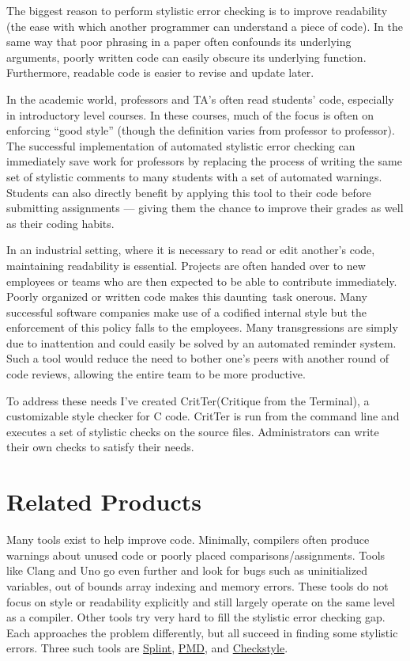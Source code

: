\documentclass[12pt]{report}
\newcommand{\programName}{CritTer\xspace}
\begin{document}
The biggest reason to perform stylistic error checking is to improve readability (the 
ease with which another programmer can understand a piece of code). In the same way that 
poor phrasing in a paper often confounds its underlying arguments, poorly written code can easily 
obscure its underlying function. Furthermore, readable code is easier to revise and update later. 

In the academic world, professors and TA's often read students' code, especially in introductory level
courses. In these courses, much of the focus is often on enforcing ``good style'' (though the definition 
varies from professor to professor).  The successful implementation of automated stylistic error 
checking can immediately save work for professors by replacing the process of writing the same set of 
stylistic comments to many students with a set of automated warnings. Students can also directly 
benefit by applying this tool to their code before submitting assignments --- giving them the chance to 
improve their grades as well as their coding habits.

In an industrial setting, where it is necessary to read or edit another's code, maintaining readability is 
essential. Projects are often handed over to new employees or teams who are then expected to be 
able to contribute immediately. Poorly organized or written code makes this daunting\ task 
onerous. Many successful software companies make use of a codified internal style but the 
enforcement of this policy falls to the employees. Many transgressions are simply due to inattention 
and could easily be solved by an automated reminder system. Such a tool would reduce the need to 
bother one's peers with another round of code reviews, allowing the entire team to be more productive. 

To address these needs I've created \programName (Critique from the Terminal), a customizable style 
checker for C code. \programName is run from the command line and executes a set of stylistic checks 
on the source files. Administrators can write their own checks to satisfy their needs.

\chapter{Related Products}

Many tools exist to help improve code. Minimally, compilers often produce warnings about unused code 
or poorly placed comparisons\slash assignments. Tools like Clang\cite{clang} and Uno\cite{Uno} go 
even further and look for bugs such as uninitialized variables, out of bounds array indexing and memory 
errors. These tools do not focus on style or readability explicitly and still largely operate on the same 
level as a compiler.  Other tools try very hard to fill the stylistic error checking gap. Each approaches the 
problem differently, but all succeed in finding some stylistic errors. Three such tools are 
\hyperref[sec:splint]{Splint}\cite{splint-manual}, \hyperref[sec:pmdAndCheckstyle]{PMD}\cite{pmd}, and 
\hyperref[sec:pmdAndCheckstyle]{Checkstyle}\cite{checkstyle}.
\end{document}
